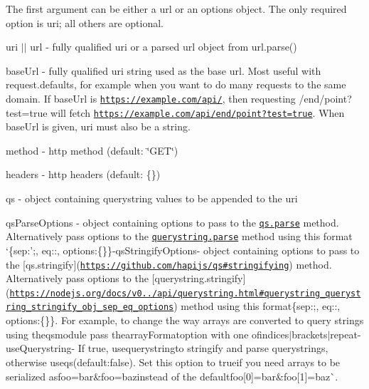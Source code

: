 The first argument can be either a {\ttfamily url} or an {\ttfamily options} object. The only required option is {\ttfamily uri}; all others are optional.


\begin{DoxyItemize}
\item {\ttfamily uri} $\vert$$\vert$ {\ttfamily url} -\/ fully qualified uri or a parsed url object from {\ttfamily url.\+parse()}
\item {\ttfamily base\+Url} -\/ fully qualified uri string used as the base url. Most useful with {\ttfamily request.\+defaults}, for example when you want to do many requests to the same domain. If {\ttfamily base\+Url} is {\ttfamily \href{https://example.com/api/}{\tt https\+://example.\+com/api/}}, then requesting {\ttfamily /end/point?test=true} will fetch {\ttfamily \href{https://example.com/api/end/point?test=true}{\tt https\+://example.\+com/api/end/point?test=true}}. When {\ttfamily base\+Url} is given, {\ttfamily uri} must also be a string.
\item {\ttfamily method} -\/ http method (default\+: {\ttfamily \char`\"{}\+G\+E\+T\char`\"{}})
\item {\ttfamily headers} -\/ http headers (default\+: {\ttfamily \{\}}) 


\item {\ttfamily qs} -\/ object containing querystring values to be appended to the {\ttfamily uri}
\item {\ttfamily qs\+Parse\+Options} -\/ object containing options to pass to the \href{https://github.com/hapijs/qs#parsing-objects}{\tt qs.\+parse} method. Alternatively pass options to the \href{https://nodejs.org/docs/v0.12.0/api/querystring.html#querystring_querystring_parse_str_sep_eq_options}{\tt querystring.\+parse} method using this format `\{sep\+:';\textquotesingle{}, eq\+:\textquotesingle{}\+:\textquotesingle{}, options\+:\{\}\}{\ttfamily  -\/}qs\+Stringify\+Options{\ttfamily -\/ object containing options to pass to the \mbox{[}qs.\+stringify\mbox{]}(\href{https://github.com/hapijs/qs#stringifying}{\tt https\+://github.\+com/hapijs/qs\#stringifying}) method. Alternatively pass options to the \mbox{[}querystring.\+stringify\mbox{]}(\href{https://nodejs.org/docs/v0.12.0/api/querystring.html#querystring_querystring_stringify_obj_sep_eq_options}{\tt https\+://nodejs.\+org/docs/v0../api/querystring.\+html\#querystring\+\_\+querystring\+\_\+stringify\+\_\+obj\+\_\+sep\+\_\+eq\+\_\+options}) method using this format}\{sep\+:\textquotesingle{};\textquotesingle{}, eq\+:\textquotesingle{}\+:\textquotesingle{}, options\+:\{\}\}{\ttfamily . For example, to change the way arrays are converted to query strings using the}qs{\ttfamily module pass the}array\+Format{\ttfamily option with one of}indices$\vert$brackets$\vert$repeat{\ttfamily  -\/}use\+Querystring{\ttfamily -\/ If true, use}querystring{\ttfamily to stringify and parse querystrings, otherwise use}qs{\ttfamily (default\+:}false{\ttfamily ). Set this option to }true{\ttfamily if you need arrays to be serialized as}foo=bar\&foo=baz{\ttfamily instead of the default}foo\mbox{[}0\mbox{]}=bar\&foo\mbox{[}1\mbox{]}=baz\`{}. 



\end{DoxyItemize}
